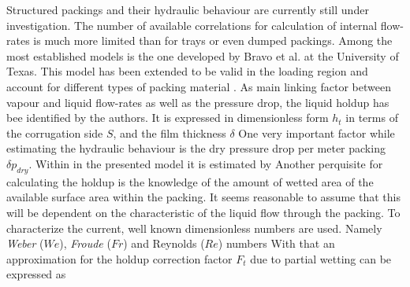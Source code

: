         Structured packings and their hydraulic behaviour are currently still under investigation. The number
        of available correlations for calculation of internal flow-rates is much more limited than for trays or even
        dumped packings. Among the most established models is the one developed by Bravo et al. \cite{Rocha.1993} at the
        University of Texas. This model has been extended to be valid in the loading region and account for different types
        of packing material \cite{Gualito.1997}. As main linking factor between vapour and liquid flow-rates as well as
        the pressure drop, the liquid holdup has bee identified by the authors. It is expressed in dimensionless form $h_t$ in
        terms of the corrugation side $S$, and the film thickness $\delta$
        One very important factor while estimating the hydraulic behaviour is the dry pressure drop per meter packing $\delta p_{dry}$.
        Within in the presented model it is estimated by
        Another perquisite for calculating the holdup is the knowledge of the amount of wetted area of the available
        surface area within the packing. It seems reasonable to assume that this will be dependent on the characteristic
        of the liquid flow through the packing. To characterize the current, well known dimensionless numbers are
        used. Namely \emph{Weber} ($We$), \emph{Froude} ($Fr$) and Reynolds ($Re$) numbers
        With that an approximation for the holdup correction factor $F_t$ due to partial wetting can be expressed as

